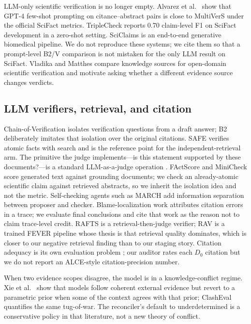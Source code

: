 \documentclass[11pt,a4paper]{article}
\newcommand{\Dzero}{\ensuremath{D_0}}
\begin{document}
LLM-only scientific verification is no longer empty. Alvarez et
al.~\citep{alvarez2024zeroshot} show that GPT-4 few-shot prompting on
citance--abstract pairs is close to MultiVerS under the official SciFact
metrics. TripleCheck \citep{gonzalez2025triplecheck} reports 0.70
claim-level F1 on SciFact development in a zero-shot setting. SciClaims
\citep{ortega2025sciclaims} is an end-to-end generative biomedical
pipeline. We do not reproduce these systems; we cite them so that a
prompt-level B2/V comparison is not mistaken for the only LLM result on
SciFact. Vladika and Matthes \citep{vladika2024knowledge} compare
knowledge sources for open-domain scientific verification and motivate
asking whether a different evidence source changes verdicts.

\subsection{LLM verifiers, retrieval, and citation}

Chain-of-Verification \citep{dhuliawala2024cove} isolates verification
questions from a draft answer; B2 deliberately imitates that isolation
over the original citations. SAFE \citep{wei2024longform} verifies atomic
facts with search and is the reference point for the independent-retrieval
arm. The primitive the judge implements---is this statement supported by
these documents?---is a standard LLM-as-a-judge operation
\citep{zheng2023llmasjudge}. FActScore \citep{min2023factscore} and
MiniCheck \citep{tang2024minicheck} score generated text against grounding
documents; we check an already-atomic scientific claim against retrieved
abstracts, so we inherit the isolation idea and not the metric.
Self-checking agents such as MARCH \citep{march2026,march2026code} add
information separation between proposer and checker. Blame-localization
work \citep{hirsch2026blame} attributes citation errors in a trace; we
evaluate final conclusions and cite that work as the reason not to claim
trace-level credit. RAFTS \citep{yue2024rafts} is a retrieval-then-judge
verifier; RAV \citep{zheng2024rav} is a trained FEVER pipeline whose
thesis is that retrieval quality dominates, which is closer to our
negative retrieval finding than to our staging story. Citation adequacy
is its own evaluation problem \citep{gao2023alce}; our auditor rates each
\Dzero{} citation but we do not report an ALCE-style citation-precision
number.

When two evidence scopes disagree, the model is in a knowledge-conflict
regime. Xie et al.~\citep{xie2024chameleon} show that models follow
coherent external evidence but revert to a parametric prior when some of
the context agrees with that prior; ClashEval \citep{wu2024clasheval}
quantifies the same tug-of-war. The reconciler's default to
underdetermined is a conservative policy in that literature, not a new
theory of conflict.
\end{document}
